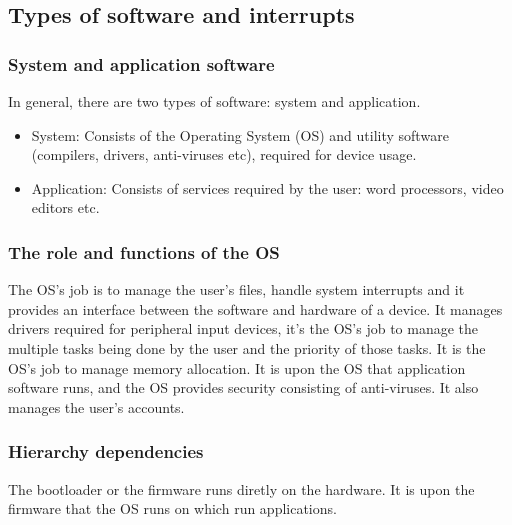 \documentclass{article}
\begin{document}
\subsection{Types of software and interrupts}
\subsubsection{System and application software}
In general, there are two types of software: system and application.
\begin{itemize}
	\item System: Consists of the Operating System (OS) and utility software (compilers,
		drivers, anti-viruses etc), required for device usage.
	\item Application: Consists of services required by the user: word processors, video
		editors etc.
\end{itemize}

\subsubsection{The role and functions of the OS}
The OS's job is to manage the user's files, handle system interrupts and it provides an
interface between the software and hardware of a device. It manages drivers required for
peripheral input devices, it's the OS's job to manage the multiple tasks being done by
the user and the priority of those tasks. It is the OS's job to manage memory allocation.
It is upon the OS that application software runs, and the OS provides security consisting
of anti-viruses. It also manages the user's accounts.

\subsubsection{Hierarchy dependencies}
The bootloader or the firmware runs diretly on the hardware. It is upon the firmware that
the OS runs on which run applications.
\end{document}
